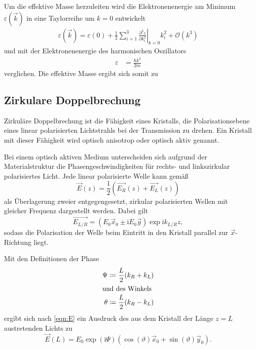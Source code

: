 Um die effektive Masse herzuleiten wird die Elektronenenergie am Minimum $\varepsilon(\vec{k})$ in eine Taylorreihe um $k=0$ entwickelt
\begin{align*}
    \varepsilon(\vec{k})=\varepsilon(0) + \frac{1}{2}\sum_{i=1}^3 \left. \frac{\partial^2 \varepsilon}{\partial k_i^2}\right|_{k=0}k_i^2 + \mathcal{O}(k^3)
\end{align*}
und mit der Elektronenenergie des harmonischen Oszillators
\begin{align*}
    \varepsilon &= \frac{\hbar k^2}{2m}
\end{align*}
verglichen.
Die effektive Masse ergibt sich somit zu




\subsection{Zirkulare Doppelbrechung}
\label{sub:Doppelbrechung}
Zirkuläre Doppelbrechung ist die Fähigkeit eines Kristalls, die Polarisationsebene eines linear polarisierten Lichtstrahls bei der Transmission
zu drehen. Ein Kristall mit dieser Fähigkeit wird optisch anisotrop oder optisch aktiv genannt.

Bei einem optisch aktiven Medium unterscheiden sich aufgrund der Materialstruktur die Phasengeschwindigkeiten für rechts- und linkszirkular
polarisiertes Licht.
Jede linear polarisierte Welle kann gemäß
\begin{equation}
    \vec{E}(z)=\frac{1}{2}(\vec{E_R}(z)+\vec{E_L}(z))
    \label{eqn:E}   
\end{equation}
als Überlagerung zweier entgegengesetzt, zirkular polarisierten Wellen mit gleicher Frequenz dargestellt werden. Dabei gilt
\begin{equation*}
    \vec{E_{L/R}}=(E_0\vec{x}_0\pm \text{i}E_0\vec{y})\exp{\text{i}k_{L/R}z},
\end{equation*}
sodass die Polarisation der Welle beim Eintritt in den Kristall parallel zur $\vec{x}$-Richtung liegt.

Mit den Definitionen der Phase
\begin{align*}
    \Psi  &\coloneqq \frac{L}{2}(k_R+k_L)\\
    \shortintertext{und des Winkels}
    \theta&\coloneqq \frac{L}{2}(k_R-k_L)
\end{align*}
ergibt sich nach \autoref{eqn:E} ein Ausdruck des aus dem Kristall der Länge $z=L$ austretenden Lichts zu 
\begin{equation*}
    \vec{E}(L)=E_0 \exp(\text{i}\Psi)\left(\cos(\vartheta) \vec{x}_0 + \sin(\vartheta)\vec{y}_0\right).
\end{equation*}


